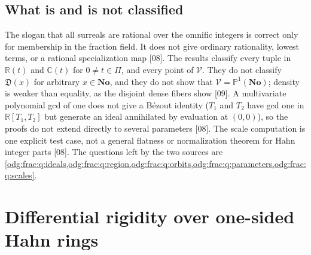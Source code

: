 \documentclass[11pt,oneside]{article}
\numberwithin{equation}{section}
\theoremstyle{definition}
\theoremstyle{remark}
\newcommand{\No}{\mathbf{No}}
\newcommand{\R}{\mathbb R}
\newcommand{\C}{\mathbb C}
\newcommand{\src}[1]{\textup{\textsf{\small[#1]}}}
\newcommand{\Den}{\mathfrak D}
\newcommand{\Vreg}{\mathcal V}
\begin{document}
\subsection{What is and is not classified}\label{odg:frac:sub:scope}

The slogan that all surreals are rational over the omnific integers is correct
only for membership in the fraction field. It does not give ordinary rationality,
lowest terms, or a rational specialization map \src{08}. The results classify
every tuple in $\R(t)$ and $\C(t)$ for $0\ne t\in\Pi$, and every point of
$\Vreg$. They do not classify $\Den(x)$ for arbitrary $x\in\No$, and they do not
show that $\Vreg=\mathbb P^1(\No)$; density is weaker than equality, as the
disjoint dense fibers show \src{09}. A multivariate polynomial gcd of one does
not give a B\'ezout identity ($T_1$ and $T_2$ have gcd one in $\R[T_1,T_2]$ but
generate an ideal annihilated by evaluation at $(0,0)$), so the proofs
do not extend directly to several
parameters \src{08}. The scale computation is one explicit test case, not a
general flatness or normalization theorem for Hahn integer parts \src{08}. The
questions left by the two sources are
\cref{odg:frac:q:ideals,odg:frac:q:region,odg:frac:q:orbits,odg:frac:q:parameters,odg:frac:q:scales}.

\section{Differential rigidity over one-sided Hahn rings}\label{odg:cr:sec:principle}
\end{document}
